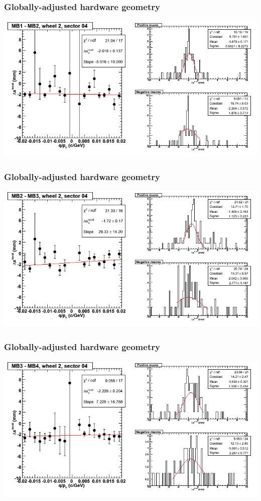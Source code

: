\documentclass[compress]{beamer}
\begin{document}
\begin{frame}
\frametitle{Globally-adjusted hardware geometry}
\includegraphics[width=\linewidth]{NOV4_segdiffs_HW/dt13_resid_E_04_12.png}
\end{frame}

\begin{frame}
\frametitle{Globally-adjusted hardware geometry}
\includegraphics[width=\linewidth]{NOV4_segdiffs_HW/dt13_resid_E_04_23.png}
\end{frame}

\begin{frame}
\frametitle{Globally-adjusted hardware geometry}
\includegraphics[width=\linewidth]{NOV4_segdiffs_HW/dt13_resid_E_04_34.png}
\end{frame}
\end{document}
